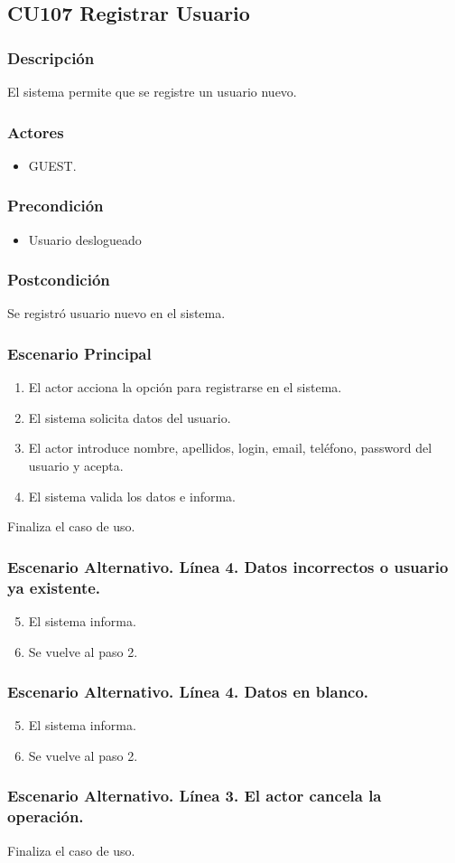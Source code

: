 \subsection{CU107 Registrar Usuario}
\subsubsection{Descripci\'{o}n}
El sistema permite que se registre un usuario nuevo.
\subsubsection{Actores}
\begin{itemize}
\item GUEST.
\end{itemize}
\subsubsection{Precondici\'{o}n}
\begin{itemize}
\item Usuario deslogueado 
\end{itemize}
\subsubsection{Postcondici\'{o}n}
Se registr\'{o} usuario nuevo en el sistema.
\subsubsection{Escenario Principal}
\begin{enumerate}
\item El actor acciona la opci\'{o}n para registrarse en el sistema.
\item El sistema solicita datos del usuario.
\item El actor introduce nombre, apellidos, login, email, tel\'{e}fono, password del usuario y acepta.
\item El sistema valida los datos e informa.
\end{enumerate}
Finaliza el caso de uso.
\subsubsection{Escenario Alternativo. L\'{i}nea 4. Datos incorrectos o usuario ya existente.}
\begin{enumerate}
\setcounter{enumi}{4}
\item El sistema informa.
\item Se vuelve al paso 2.
\end{enumerate}
\subsubsection{Escenario Alternativo. L\'{i}nea 4. Datos en blanco.}
\begin{enumerate}
\setcounter{enumi}{4}
\item El sistema informa.
\item Se vuelve al paso 2.
\end{enumerate}
\subsubsection{Escenario Alternativo. L\'{i}nea 3. El actor cancela la operaci\'{o}n.}
Finaliza el caso de uso.
